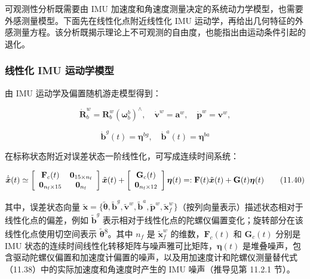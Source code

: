可观测性分析既需要由 IMU 加速度和角速度测量决定的系统动力学模型，也需要外感测量模型。下面先在线性化点附近线性化 IMU 运动学，再给出几何特征的外感测量方程。该分析既揭示理论上不可观测的自由度，也能指出由运动条件引起的退化。

\subsubsection{线性化 IMU 运动学模型}

由 IMU 运动学及偏置随机游走模型得到：

\begin{equation}
\dot {\pmb {R}} _ {b} ^ {w} = \pmb {R} _ {b} ^ {w} (\pmb {\omega} _ {b} ^ {b}) ^ {\wedge}, \quad \dot {\pmb {v}} ^ {w} = \mathbf {a} ^ {w}, \quad \dot {\pmb {p}} ^ {w} = \pmb {v} ^ {w},\tag{11.38}
\end{equation}

\begin{equation}
\dot {\mathbf {b}} ^ {g} (t) = \boldsymbol {\eta} ^ {b g}, \quad \dot {\mathbf {b}} ^ {a} (t) = \boldsymbol {\eta} ^ {b a}\tag{11.39}
\end{equation}

在标称状态附近对误差状态一阶线性化，可写成连续时间系统：

\begin{equation}
\dot {\tilde {\boldsymbol {x}}} (t) \simeq \left[ \begin{array}{c c} \mathbf {F} _ {c} (t) & \mathbf {0} _ {1 5 \times n _ {\mathrm{f}}} \\ \mathbf {0} _ {n _ {\mathrm{f}} \times 1 5} & \mathbf {0} _ {n _ {\mathrm{f}}} \end{array} \right] \tilde {\boldsymbol {x}} (t) + \left[ \begin{array}{c} \mathbf {G} _ {c} (t) \\ \mathbf {0} _ {n _ {\mathrm{f}} \times 1 2} \end{array} \right] \boldsymbol {\eta} (t) =: \mathbf {F} (t) \tilde {\boldsymbol {x}} (t) + \mathbf {G} (t) \boldsymbol {\eta} (t)\tag{11.40}
\end{equation}

其中，误差状态向量 $\tilde{\boldsymbol{x}}=\{\tilde{\boldsymbol\theta},\tilde{\mathbf b}^{g},\tilde{\mathbf v}^{w},\tilde{\mathbf b}^{a},\tilde{\mathbf p}^{w},\tilde{\mathbf x}_{f}^{w}\}$（按列向量表示）描述状态相对于线性化点的偏差，例如 $\tilde{\mathbf b}^{g}$ 表示相对于线性化点的陀螺仪偏置变化；旋转部分在该线性化点使用切空间表示 $\tilde{\boldsymbol\theta}$\textsuperscript{8}。其中 $n_f$ 是 $\tilde{\mathbf x}_{f}^{w}$ 的维数，$\mathbf F_c(t)$ 和 $\mathbf G_c(t)$ 分别是 IMU 状态的连续时间线性化转移矩阵与噪声雅可比矩阵，$\boldsymbol\eta(t)$ 是堆叠噪声，包含驱动陀螺仪偏置和加速度计偏置的噪声，以及用加速度计和陀螺仪测量替代式（11.38）中的实际加速度和角速度时产生的 IMU 噪声（推导见第 11.2.1 节）。


